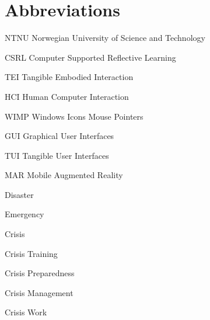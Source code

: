 \section{Abbreviations}\label{abbreviations}

NTNU Norwegian University of Science and Technology

CSRL Computer Supported Reflective Learning

TEI Tangible Embodied Interaction

HCI Human Computer Interaction

WIMP Windows Icons Mouse Pointers

GUI Graphical User Interfaces

TUI Tangible User Interfaces

MAR Mobile Augmented Reality

Disaster

Emergency

Crisis

Crisis Training

Crisis Preparedness

Crisis Management

Crisis Work
